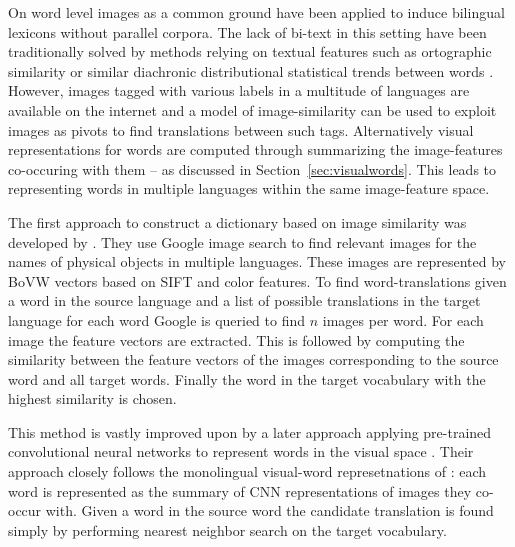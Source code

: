 On word level images as a common ground have been applied to induce bilingual
lexicons without parallel corpora. The lack of bi-text in this setting have
been traditionally solved by methods relying on textual features
such as ortographic similarity \cite{haghighi2008learning} or similar diachronic distributional
statistical trends between words \cite{schafer2002inducing}.
However, images tagged with various labels in a multitude of languages are
available on the internet and a model of image-similarity can be used to exploit
images as pivots to find translations between such tags. Alternatively visual representations
for words are computed through summarizing the image-features co-occuring with them
-- as discussed in Section~\ref{sec:visualwords}. This leads to representing
words in multiple languages within the same image-feature space.

The first approach to construct a dictionary based on image similarity was
developed by \cite{bergsma2011learning}. They use Google image search to find
relevant images for the names of physical objects in multiple languages.
These images are represented by BoVW vectors based
on SIFT and color features. To find word-translations given a word in the
source language and a list of possible translations in the target language
for each word Google is queried to find $n$ images per word. For each image the
feature vectors are extracted. This is followed by computing the similarity
between the feature vectors of the images corresponding to the source word and
all target words. Finally the word in the target vocabulary with the highest
similarity is chosen.

This method is vastly improved upon by a later approach applying
pre-trained convolutional neural networks to represent words
in the visual space \cite{kiela2015visual}. Their approach closely follows
the monolingual visual-word represetnations of \cite{kiela2014improving}:
each word is represented as the summary of CNN representations of images they
co-occur with. Given a word in the source word the candidate translation is found
simply by performing nearest neighbor search on the target vocabulary.

